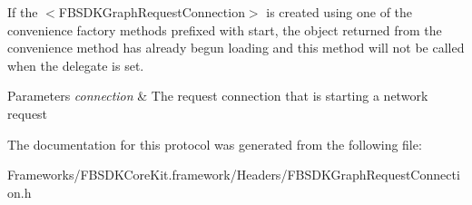 If the $<$\+F\+B\+S\+D\+K\+Graph\+Request\+Connection$>$ is created using one of the convenience factory methods prefixed with start, the object returned from the convenience method has already begun loading and this method will not be called when the delegate is set.


\begin{DoxyParams}{Parameters}
{\em connection} & The request connection that is starting a network request \\
\hline
\end{DoxyParams}


The documentation for this protocol was generated from the following file\+:\begin{DoxyCompactItemize}
\item 
Frameworks/\+F\+B\+S\+D\+K\+Core\+Kit.\+framework/\+Headers/F\+B\+S\+D\+K\+Graph\+Request\+Connection.\+h\end{DoxyCompactItemize}
